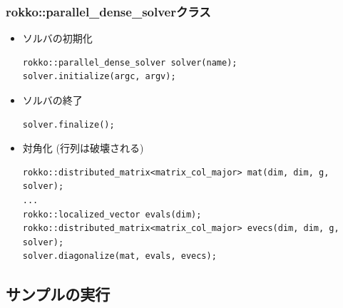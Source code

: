\begin{frame}[c,fragile]
  \frametitle{rokko::parallel\_dense\_solverクラス}
  \begin{itemize}
  \item ソルバの初期化
\begin{lstlisting}
rokko::parallel_dense_solver solver(name);
solver.initialize(argc, argv);
\end{lstlisting}
  \item ソルバの終了
\begin{lstlisting}
solver.finalize();
\end{lstlisting}
  \item 対角化 (行列は破壊される)
\begin{lstlisting}
rokko::distributed_matrix<matrix_col_major> mat(dim, dim, g, solver);
...
rokko::localized_vector evals(dim);
rokko::distributed_matrix<matrix_col_major> evecs(dim, dim, g, solver);
solver.diagonalize(mat, evals, evecs);
\end{lstlisting}
  \end{itemize}
\end{frame}

\subsection{サンプルの実行}

